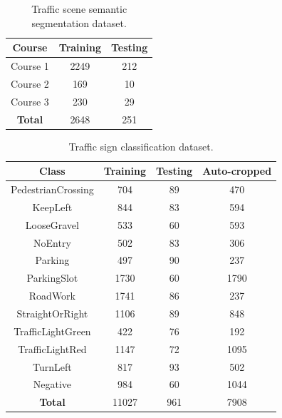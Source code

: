 \begin{table}[h]
  \begin{center}
    \caption[Traffic scene semantic segmentation dataset]{Traffic scene
      semantic segmentation dataset.}
    \label{table:semantic-segmentation-dataset}
    \begin{tabular}{|c|c|c|}
      \hline
      \textbf{Course}   & \textbf{Training} & \textbf{Testing} \\
      \hline
      Course 1          & 2249              & 212              \\
      Course 2          & 169               & 10               \\
      Course 3          & 230               & 29               \\
      \hline
      \textbf{Total}    & 2648              & 251              \\
      \hline
    \end{tabular}
  \end{center}
\end{table}


\begin{table}[h]
  \begin{center}
    \caption[Traffic sign classification dataset]{Traffic sign classification
      dataset.}
    \label{table:classification-dataset}
    \begin{tabular}{|c|c|c|c|}
      \hline
      \textbf{Class}     & \textbf{Training} & \textbf{Testing} & \textbf{Auto-cropped} \\
      \hline
      PedestrianCrossing & 704               & 89               & 470 \\
      KeepLeft           & 844               & 83               & 594 \\
      LooseGravel        & 533               & 60               & 593\\
      NoEntry            & 502               & 83               & 306 \\
      Parking            & 497               & 90               & 237 \\
      ParkingSlot        & 1730              & 60               & 1790 \\
      RoadWork           & 1741              & 86               & 237 \\
      StraightOrRight    & 1106              & 89               & 848 \\
      TrafficLightGreen  & 422               & 76               & 192 \\
      TrafficLightRed    & 1147              & 72               & 1095 \\
      TurnLeft           & 817               & 93               & 502 \\
      Negative           & 984               & 60               & 1044 \\
      \hline
      \textbf{Total}     & 11027             & 961              & 7908 \\
      \hline
    \end{tabular}
  \end{center}
\end{table}

